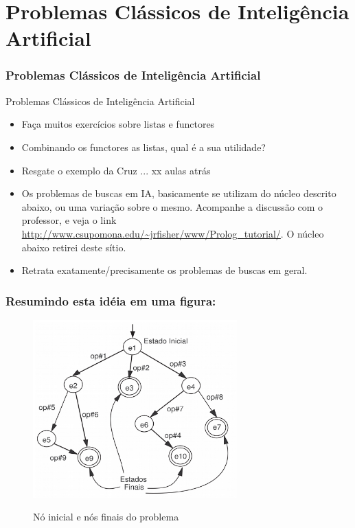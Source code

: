\documentclass[sans]{beamer}
\begin{document}
\section{Problemas Clássicos de Inteligência Artificial}
\frametitle{Problemas Clássicos de Inteligência Artificial}
\begin{frame}
\begin{block}{Problemas Clássicos de Inteligência Artificial}
\begin{itemize}
  \item Faça muitos exercícios sobre listas e functores

  \item Combinando os functores as listas, qual é a sua utilidade?

  \item Resgate o exemplo da Cruz ... xx aulas atrás

  \item Os problemas de buscas em  IA, basicamente se utilizam do
núcleo descrito abaixo, ou uma variação sobre o
mesmo. Acompanhe a discussão com o professor,
e veja o link \url{http://www.csupomona.edu/~jrfisher/www/Prolog_tutorial/}.
O núcleo abaixo retirei deste sítio. 

  \item Retrata exatamente/precisamente os 
problemas de buscas em geral.
\end{itemize}
\end{block}
\end{frame}


\begin{frame}
\frametitle{Resumindo esta idéia em uma figura:}

\begin{figure}[!htb]
\centering
\includegraphics[width=0.7\textwidth,height=0.7\textheight,keepaspectratio]{figuras/espaco-de-estados01.pdf}
\label{fig_nos_estados}
\caption{Nó inicial  e nós finais do problema}
\end{figure}
\end{frame}
\end{document}
